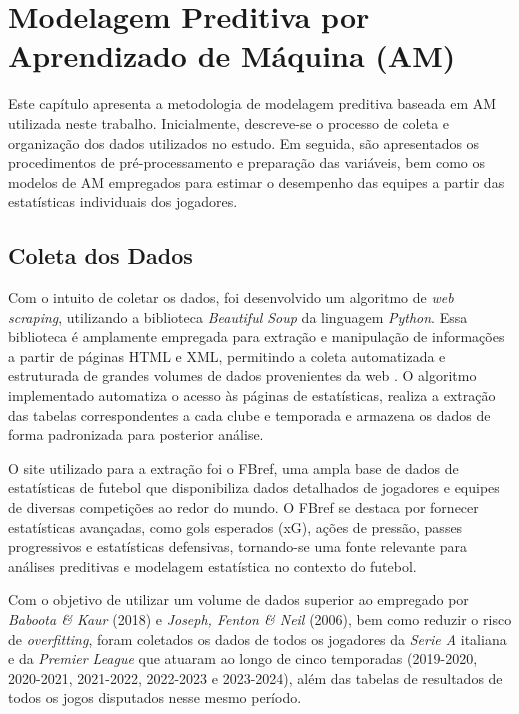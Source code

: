 \chapter{Modelagem Preditiva por Aprendizado de Máquina (AM)}

Este capítulo apresenta a metodologia de modelagem preditiva baseada em AM utilizada neste trabalho. Inicialmente, descreve-se o processo de coleta 
e organização dos dados utilizados no estudo. Em seguida, são apresentados os procedimentos de pré-processamento e preparação das variáveis, bem como os modelos de 
AM empregados para estimar o desempenho das equipes a partir das estatísticas individuais dos jogadores.

\section{Coleta dos Dados}

Com o intuito de coletar os dados, foi desenvolvido um algoritmo de \textit{web scraping}, utilizando a biblioteca \textit{Beautiful Soup} da linguagem \textit{Python}. 
Essa biblioteca é amplamente empregada para extração e manipulação de informações a partir de páginas HTML e XML, permitindo a coleta automatizada e estruturada de grandes 
volumes de dados provenientes da web \cite{beautifulsoup}. O algoritmo implementado automatiza o acesso às páginas de estatísticas, realiza a extração das tabelas 
correspondentes a cada clube e temporada e armazena os dados de forma padronizada para posterior análise.

O site utilizado para a extração foi o FBref, uma ampla base de dados de estatísticas de futebol que disponibiliza dados detalhados de jogadores e equipes de diversas 
competições ao redor do mundo. O FBref se destaca por fornecer estatísticas avançadas, como gols esperados (xG), ações de pressão, passes progressivos e 
estatísticas defensivas, tornando-se uma fonte relevante para análises preditivas e modelagem estatística no contexto do futebol.

Com o objetivo de utilizar um volume de dados superior ao empregado por \textit{Baboota \& Kaur} (2018) e \textit{Joseph, Fenton \& Neil} (2006), bem como reduzir o 
risco de \textit{overfitting}, foram coletados os dados de todos os jogadores da \textit{Serie A} italiana e da \textit{Premier League} que atuaram ao longo de cinco 
temporadas (2019-2020, 2020-2021, 2021-2022, 2022-2023 e 2023-2024), além das tabelas de resultados de todos os jogos disputados nesse mesmo período.

